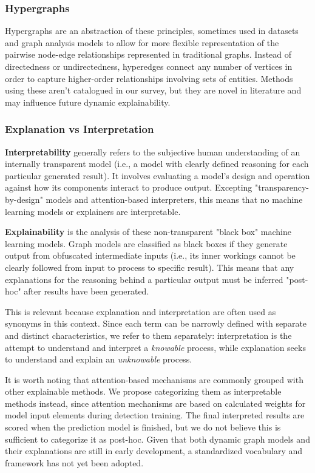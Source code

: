 \subsubsection{Hypergraphs}
Hypergraphs are an abstraction of these principles, sometimes used in datasets\cite{benson_cornell_nodate} and graph analysis models\cite{toshniwal_hypergraph_2021} to allow for more flexible representation of the pairwise node-edge relationships represented in traditional graphs. Instead of directedness or undirectedness, hyperedges connect any number of vertices in order to capture higher-order relationships involving sets of entities. Methods using these aren't catalogued in our survey, but they are novel in literature and may influence future dynamic explainability.

\subsubsection{Explanation vs Interpretation}
\textbf{Interpretability} generally refers to the subjective human understanding of an internally transparent model (i.e., a model with clearly defined reasoning for each particular generated result). It involves evaluating a model's design and operation against how its components interact to produce output\cite{zhang_trustworthy_2022}. Excepting "transparency-by-design" models and attention-based interpreters, this means that no machine learning models or explainers are interpretable. 

\textbf{Explainability} is the analysis of these non-transparent "black box" machine learning models. Graph models are classified as black boxes if they generate output from obfuscated intermediate inputs (i.e., its inner workings cannot be clearly followed from input to process to specific result). This means that any explanations for the reasoning behind a particular output must be inferred "post-hoc" after results have been generated.

This is relevant because explanation and interpretation are often used as synonyms in this context. Since each term can be narrowly defined with separate and distinct characteristics, we refer to them separately: interpretation is the attempt to understand and interpret a \textit{knowable} process, while explanation seeks to understand and explain an \textit{unknowable} process.

It is worth noting that attention-based mechanisms are commonly grouped with other explainable methods. We propose categorizing them as interpretable methods instead, since attention mechanisms are based on calculated weights for model input elements during detection training. The final interpreted results are scored when the prediction model is finished, but we do not believe this is sufficient to categorize it as post-hoc. Given that both dynamic graph models and their explanations are still in early development, a standardized vocabulary and framework has not yet been adopted.

